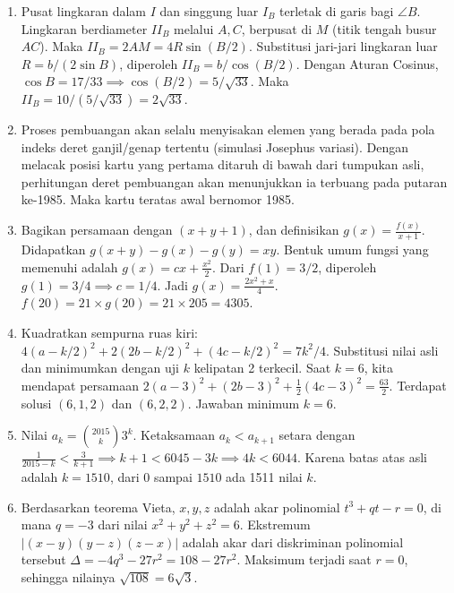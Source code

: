 \documentclass[11pt]{article}
\begin{document}
\begin{enumerate}
    \item Pusat lingkaran dalam $I$ dan singgung luar $I_B$ terletak di garis bagi $\angle B$. Lingkaran berdiameter $II_B$ melalui $A, C$, berpusat di $M$ (titik tengah busur $AC$). Maka $II_B = 2AM = 4R\sin(B/2)$. Substitusi jari-jari lingkaran luar $R = b/(2\sin B)$, diperoleh $II_B = b / \cos(B/2)$. Dengan Aturan Cosinus, $\cos B = 17/33 \implies \cos(B/2) = 5/\sqrt{33}$. Maka $II_B = 10 / (5/\sqrt{33}) = 2\sqrt{33}$.
    
    \begin{center}
    \end{center}
    \item Proses pembuangan akan selalu menyisakan elemen yang berada pada pola indeks deret ganjil/genap tertentu (simulasi Josephus variasi). Dengan melacak posisi kartu yang pertama ditaruh di bawah dari tumpukan asli, perhitungan deret pembuangan akan menunjukkan ia terbuang pada putaran ke-1985. Maka kartu teratas awal bernomor 1985.
    \item Bagikan persamaan dengan $(x+y+1)$, dan definisikan $g(x) = \frac{f(x)}{x+1}$. Didapatkan $g(x+y) - g(x) - g(y) = xy$. Bentuk umum fungsi yang memenuhi adalah $g(x) = cx + \frac{x^2}{2}$. Dari $f(1)=3/2$, diperoleh $g(1)=3/4 \implies c=1/4$. Jadi $g(x) = \frac{2x^2+x}{4}$. $f(20) = 21 \times g(20) = 21 \times 205 = 4305$.
    \item Kuadratkan sempurna ruas kiri: $4(a-k/2)^2 + 2(2b-k/2)^2 + (4c-k/2)^2 = 7k^2/4$. Substitusi nilai asli dan minimumkan dengan uji $k$ kelipatan 2 terkecil. Saat $k=6$, kita mendapat persamaan $2(a-3)^2 + (2b-3)^2 + \frac{1}{2}(4c-3)^2 = \frac{63}{2}$. Terdapat solusi $(6,1,2)$ dan $(6,2,2)$. Jawaban minimum $k=6$.
    \item Nilai $a_k = \binom{2015}{k} 3^k$. Ketaksamaan $a_k < a_{k+1}$ setara dengan $\frac{1}{2015-k} < \frac{3}{k+1} \implies k+1 < 6045 - 3k \implies 4k < 6044$. Karena batas atas asli adalah $k = 1510$, dari $0$ sampai $1510$ ada 1511 nilai $k$.
    \item Berdasarkan teorema Vieta, $x,y,z$ adalah akar polinomial $t^3 + qt - r = 0$, di mana $q = -3$ dari nilai $x^2+y^2+z^2=6$. Ekstremum $|(x-y)(y-z)(z-x)|$ adalah akar dari diskriminan polinomial tersebut $\Delta = -4q^3 - 27r^2 = 108 - 27r^2$. Maksimum terjadi saat $r=0$, sehingga nilainya $\sqrt{108} = 6\sqrt{3}$.
\end{enumerate}
\end{document}

